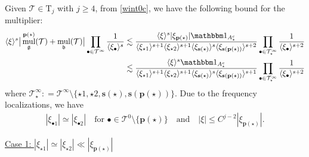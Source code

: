 \documentclass[%
11pt,  reqno]{amsart}
\newcommand{\5}{\textup{V}}
\newcommand{\noi}{\noindent}
\newcommand{\ind}{\mathbbm 1}
\newcommand{\les}{\lesssim}
\theoremstyle{remark}
\newcommand{\bul}{\bullet}
\newcommand{\TT}{\mathcal{T}}
\newcommand{\Tr}{\mathrm{T}}
\newcommand{\bfrak}{\mathfrak{b}}
\newcommand{\gfrak}{\mathfrak{g}}
\newcommand{\pb}{\mathbf{p}}
\newcommand{\sbf}{\mathbf{s}}
\newcommand{\jb}[1]
{\langle #1 \rangle}
\DeclareMathOperator{\mul}{mul}
\numberwithin{equation}{section}
\numberwithin{theorem}{section}
\begin{document}
Given $\TT \in \Tr_j$ with $j\ge4$, from \eqref{wint0c}, we have the following bound for the multiplier:
\begin{align}
    \jb{\xi}^s \big| \mul_\gfrak^{\pb(\star)} (\TT) + \mul_\bfrak(\TT) \big| 
    \prod_{\bul \in \TT^\infty} \frac{1}{\jb{\xi_\bul}^s}
    &
    \les 
    \frac{\jb{\xi}^{s} |\xi_{\pb(\star)}|  \ind_{A_\star^c} }{ \jb{\xi_{\star1}}^{s+1} \jb{\xi_{\star2}}^{s+1} \jb{\xi_{\sbf(\star)}}^s \jb{\xi_{\sbf(\pb(\star))}}^{s+2}} \prod_{\bul \in \TT^\infty_\star} \frac{1}{\jb{\xi_\bul}^{s+2}}
    \\
    &
    \les 
    \frac{\jb{\xi}^{s} \ind_{A_\star^c} }{ \jb{\xi_{\star1}}^{s+1} \jb{\xi_{\star2}}^{s+1} \jb{\xi_{\sbf(\star)}}^s \jb{\xi_{\sbf(\pb(\star))}}^{s+1}} \prod_{\bul \in \TT^\infty_\star} \frac{1}{\jb{\xi_\bul}^{s+2}}
\end{align}
where $\TT^\infty_\star : = \TT^\infty \setminus \{\star1, \star2, \sbf(\star), \sbf(\pb(\star))\}$. 
Due to the frequency localizations, we have
\begin{align}
    |\xi_{\bul1}| \simeq |\xi_{\bul2}| \quad \text{for } \bul \in \TT^0\setminus\{\pb(\star)\} 
    \quad 
    \text{and}
    \quad 
    |\xi| \le C^{j-2} |\xi_{\pb(\star)}| .  
\end{align}



\smallskip
\noi
\underline{Case 1: $|\xi_{\star1}| \simeq |\xi_{\star2}| \ll |\xi_{\pb(\star)}|$}
\end{document}
